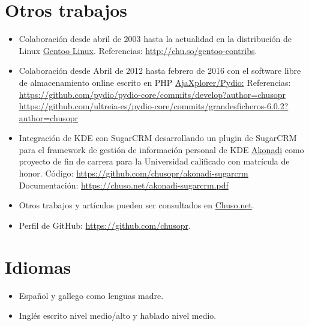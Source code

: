 \documentclass[spanish]{simplecv}
\begin{document}
\section{Otros trabajos}

\begin{itemize}
\item Colaboración desde abril de 2003 hasta la actualidad en la distribución
de Linux \href{http://www.gentoo.org}{Gentoo Linux}.\newline
Referencias: \url{http://chu.so/gentoo-contribs}.
\item Colaboración desde Abril de 2012 hasta febrero de 2016 con el software libre de almacenamiento online escrito en PHP \href{https://pyd.io/}{AjaXplorer/Pydio:}
Referencias:\newline
\url{https://github.com/pydio/pydio-core/commits/develop?author=chusopr}
\url{https://github.com/ultreia-es/pydio-core/commits/grandesficheros-6.0.2?author=chusopr}
\item Integración de KDE con SugarCRM desarrollando un plugin de SugarCRM para el framework de gestión de información personal de KDE \href{https://community.kde.org/KDE_PIM/Akonadi}{Akonadi} como proyecto de fin de carrera para la Universidad calificado con matrícula de honor.\newline
Código: \url{https://github.com/chusopr/akonadi-sugarcrm}\newline
Documentación: \url{https://chuso.net/akonadi-sugarcrm.pdf}
\item Otros trabajos y artículos pueden ser consultados en \href{https://chuso.net}{Chuso.net}.
\item Perfil de GitHub: \url{https://github.com/chusopr}.
\end{itemize}

\section{Idiomas}

\begin{itemize}
\item Español y gallego como lenguas madre.
\item Inglés escrito nivel medio/alto y hablado nivel medio.
\end{itemize}
\end{document}
